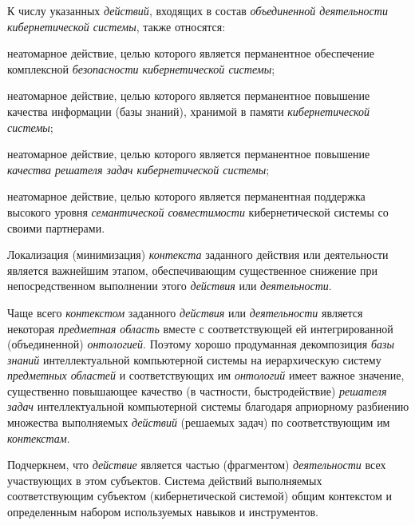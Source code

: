 К числу указанных  \textit{действий}, входящих в состав \textit{объединенной деятельности кибернетической системы}, также относятся:
\begin{textitemize}
	\item неатомарное действие, целью которого является перманентное обеспечение комплексной \textit{безопасности кибернетической системы};
	\item неатомарное действие, целью которого является перманентное повышение качества информации (базы знаний), хранимой в памяти \textit{кибернетической системы};
	\item неатомарное действие, целью которого является перманентное повышение \textit{качества решателя задач кибернетической системы};
	\item неатомарное действие, целью которого является перманентная поддержка высокого уровня \textit{семантической совместимости} кибернетической системы со своими партнерами.
\end{textitemize}


Локализация (минимизация) \textit{контекста} заданного действия или деятельности является важнейшим  этапом, обеспечивающим существенное снижение  при непосредственном выполнении этого \textit{действия} или \textit{деятельности}.

Чаще всего \textit{контекстом} заданного \textit{действия} или \textit{деятельности} является некоторая \textit{предметная область} вместе с соответствующей ей интегрированной (объединенной) \textit{онтологией}. Поэтому хорошо продуманная декомпозиция \textit{базы знаний} интеллектуальной компьютерной системы на иерархическую систему \textit{предметных областей} и соответствующих им \textit{онтологий} имеет важное  значение, существенно повышающее качество (в частности, быстродействие) \textit{решателя задач} интеллектуальной компьютерной системы благодаря априорному разбиению множества выполняемых \textit{действий} (решаемых задач) по соответствующим им \textit{контекстам}.

\begin{SCn}
\end{SCn}

Подчеркнем, что \textit{действие} является частью (фрагментом) \textit{деятельности} всех участвующих в этом субъектов. Система действий выполняемых соответствующим субъектом (кибернетической системой)  общим контекстом и определенным набором используемых навыков и инструментов.

